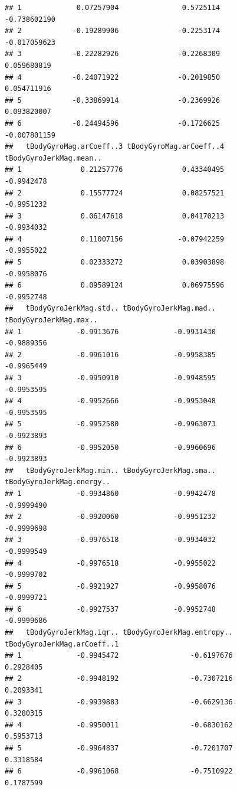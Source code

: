 \documentclass[
]{article}
\begin{document}
\begin{verbatim}
## 1             0.07257904               0.5725114            -0.738602190
## 2            -0.19289906              -0.2253174            -0.017059623
## 3            -0.22282926              -0.2268309             0.059680819
## 4            -0.24071922              -0.2019850             0.054711916
## 5            -0.33869914              -0.2369926             0.093820007
## 6            -0.24494596              -0.1726625            -0.007801159
##   tBodyGyroMag.arCoeff..3 tBodyGyroMag.arCoeff..4 tBodyGyroJerkMag.mean..
## 1              0.21257776              0.43340495              -0.9942478
## 2              0.15577724              0.08257521              -0.9951232
## 3              0.06147618              0.04170213              -0.9934032
## 4              0.11007156             -0.07942259              -0.9955022
## 5              0.02333272              0.03903898              -0.9958076
## 6              0.09589124              0.06975596              -0.9952748
##   tBodyGyroJerkMag.std.. tBodyGyroJerkMag.mad.. tBodyGyroJerkMag.max..
## 1             -0.9913676             -0.9931430             -0.9889356
## 2             -0.9961016             -0.9958385             -0.9965449
## 3             -0.9950910             -0.9948595             -0.9953595
## 4             -0.9952666             -0.9953048             -0.9953595
## 5             -0.9952580             -0.9963073             -0.9923893
## 6             -0.9952050             -0.9960696             -0.9923893
##   tBodyGyroJerkMag.min.. tBodyGyroJerkMag.sma.. tBodyGyroJerkMag.energy..
## 1             -0.9934860             -0.9942478                -0.9999490
## 2             -0.9920060             -0.9951232                -0.9999698
## 3             -0.9976518             -0.9934032                -0.9999549
## 4             -0.9976518             -0.9955022                -0.9999702
## 5             -0.9921927             -0.9958076                -0.9999721
## 6             -0.9927537             -0.9952748                -0.9999686
##   tBodyGyroJerkMag.iqr.. tBodyGyroJerkMag.entropy.. tBodyGyroJerkMag.arCoeff..1
## 1             -0.9945472                 -0.6197676                   0.2928405
## 2             -0.9948192                 -0.7307216                   0.2093341
## 3             -0.9939883                 -0.6629136                   0.3280315
## 4             -0.9950011                 -0.6830162                   0.5953713
## 5             -0.9964837                 -0.7201707                   0.3318584
## 6             -0.9961068                 -0.7510922                   0.1787599

\end{verbatim}
\end{document}
